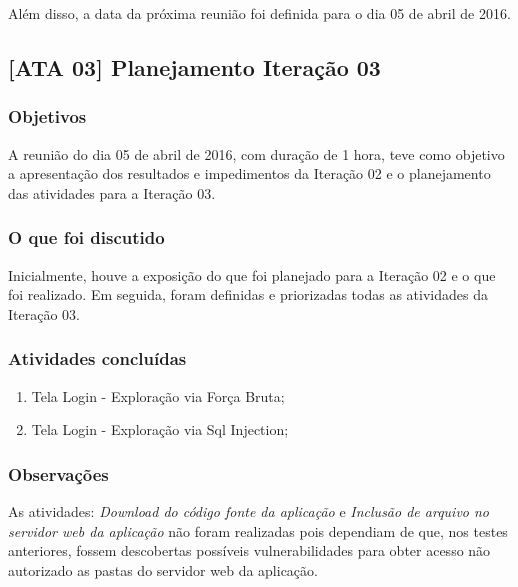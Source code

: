 \documentclass[
    12pt,               %
    openright,          %
    oneside,            %
    a4paper,            %
    section=TITLE,     %
    english,            %
    french,             %
    spanish,            %
    brazil              %
    ]{abntex2}
\begin{document}
Além disso, a data da próxima reunião foi definida para o dia 05 de abril de 2016.



\subsection*{{[}ATA 03{]} Planejamento Iteração 03}


\subsubsection*{Objetivos}

A reunião do dia 05 de abril de 2016, com duração de 1 hora, teve como objetivo a apresentação dos resultados e impedimentos da Iteração 02 e o planejamento das atividades para a Iteração 03.



\subsubsection*{O que foi discutido}

Inicialmente, houve a exposição do que foi planejado para a Iteração 02 e o que foi realizado. Em seguida, foram definidas e priorizadas todas as atividades da Iteração 03.



\subsubsection*{Atividades concluídas}


\begin{enumerate}[start=1]
	
\item Tela Login - Exploração via Força Bruta;
	
\item Tela Login - Exploração via Sql Injection;

\end{enumerate}


\subsubsection*{Observações}

As atividades: \emph{Download do código fonte da aplicação} e \emph{Inclusão de arquivo no servidor web da aplicação} não foram realizadas pois dependiam de que, nos testes anteriores, fossem descobertas possíveis vulnerabilidades para obter acesso não autorizado as pastas do servidor web da aplicação.
\end{document}
